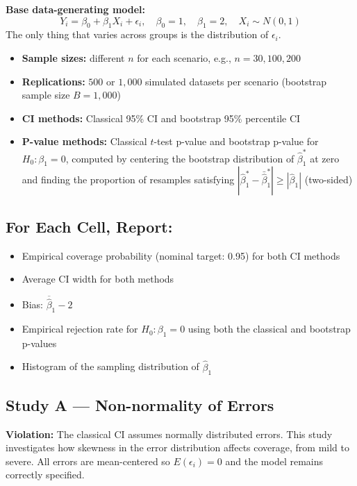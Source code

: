 \documentclass[12pt]{article}
\begin{document}
\textbf{Base data-generating model:}
\[
Y_i = \beta_0 + \beta_1 X_i + \epsilon_i, \quad \beta_0 = 1,\quad \beta_1 = 2,\quad X_i \sim N(0,1)
\]
The only thing that varies across groups is the distribution of $\epsilon_i$.

\begin{itemize}
    \item \textbf{Sample sizes:} different $n$ for each scenario, e.g., $n = 30, 100, 200$
    \item \textbf{Replications:} $500$ or $1{,}000$ simulated datasets per scenario (bootstrap sample size $B = 1{,}000$)
    \item \textbf{CI methods:} Classical 95\% CI and bootstrap 95\% percentile CI
    \item \textbf{P-value methods:} Classical $t$-test p-value and bootstrap p-value for $H_0\colon \beta_1 = 0$, computed by centering the bootstrap distribution of $\hat{\beta}_1^*$ at zero and finding the proportion of resamples satisfying $|\hat{\beta}_1^* - \bar{\hat{\beta}}_1^*| \geq |\hat{\beta}_1|$ (two-sided)
\end{itemize}

\subsection*{For Each Cell, Report:}
\begin{itemize}
    \item Empirical coverage probability (nominal target: 0.95) for both CI methods
    \item Average CI width for both methods
    \item Bias: $\overline{\hat{\beta}}_1 - 2$
    \item Empirical rejection rate for $H_0\colon\beta_1 = 0$ using both the classical and bootstrap p-values 
    \item Histogram of the sampling distribution of $\hat{\beta}_1$
\end{itemize}

\subsection*{Study A --- Non-normality of Errors}

\textbf{Violation:} The classical CI assumes normally distributed errors. This study investigates how skewness in the error distribution affects coverage, from mild to severe. All errors are mean-centered so $E(\epsilon_i) = 0$ and the model remains correctly specified.
\end{document}
